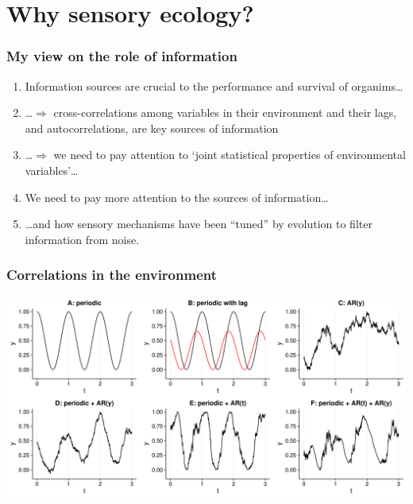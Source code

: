 \documentclass[10pt]{beamer}\usepackage[]{graphicx}\usepackage[]{xcolor}
\begin{document}
\section{Why sensory ecology?}


\begin{frame}%
\frametitle{My view on the role of information}
\begin{enumerate}
  \item Information sources are crucial to the performance and survival of organims\ldots
  \item \ldots $\Rightarrow$ cross-correlations among variables in their environment and their lags, and autocorrelations, are key sources of information
  \item \ldots $\Rightarrow$ we need to pay attention to `joint statistical properties of environmental variables'\ldots
  \item We need to pay more attention to the sources of information\ldots
  \item \ldots and how sensory mechanisms have been ``tuned'' by evolution to filter information from noise.
\end{enumerate}
\end{frame}

\begin{frame}
  \frametitle{Correlations in the environment}
  \includegraphics[width=\linewidth]{figures/cor_examples2.pdf}
\end{frame}
\end{document}
